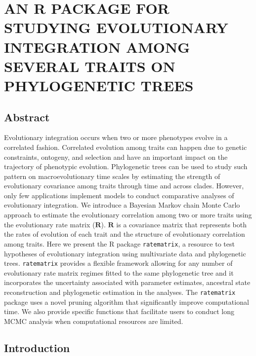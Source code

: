 
\chapter{AN R PACKAGE FOR STUDYING EVOLUTIONARY INTEGRATION AMONG SEVERAL TRAITS ON PHYLOGENETIC TREES}

\section{Abstract}

Evolutionary integration occurs when two or more phenotypes evolve in a correlated fashion. Correlated evolution among traits can happen due to genetic constraints, ontogeny, and selection and have an important impact on the trajectory of phenotypic evolution. Phylogenetic trees can be used to study such pattern on macroevolutionary time scales by estimating the strength of evolutionary covariance among traits through time and across clades. However, only few applications implement models to conduct comparative analyses of evolutionary integration. We introduce a Bayesian Markov chain Monte Carlo approach to estimate the evolutionary correlation among two or more traits using the evolutionary rate matrix ($\mathbf{R}$). $\mathbf{R}$ is a covariance matrix that represents both the rates of evolution of each trait and the structure of evolutionary correlation among traits. Here we present the R package \texttt{ratematrix}, a resource to test hypotheses of evolutionary integration using multivariate data and phylogenetic trees. \texttt{ratematrix} provides a flexible framework allowing for any number of evolutionary rate matrix regimes fitted to the same phylogenetic tree and it incorporates the uncertainty associated with parameter estimates, ancestral state reconstruction and phylogenetic estimation in the analyses. The \texttt{ratematrix} package uses a novel pruning algorithm that significantly improve computational time. We also provide specific functions that facilitate users to conduct long MCMC analysis when computational resources are limited.

\section{Introduction}

